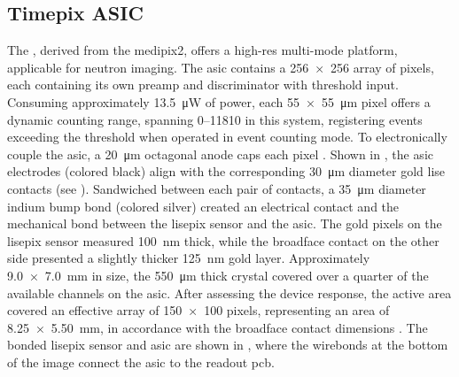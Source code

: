 \documentclass[../../../main.tex]{subfiles}
\begin{document}
%
    \subsection{Timepix ASIC}%
    \label{sec:chapter-3:advanced-imaging:timepix-asic}%
    The , derived from the \gls{medipix2}, offers a \gls{high-res} multi-mode platform, applicable for neutron imaging.
    The \gls{asic} contains a \num{256 x 256} array of pixels, each containing its own \gls{preamp} and discriminator with threshold input.
    Consuming approximately \SI{13.5}{\micro\watt} of power, each \SI{55 x 55}{\micro\meter} pixel offers a dynamic counting range, spanning \numrange{0}{11810} in this system, registering events exceeding the threshold when operated in event counting mode.
    To electronically couple the \gls{asic}, a \SI{20}{\micro\meter} octagonal anode caps each pixel \cite{Llopart_2007}.
    Shown in , the \gls{asic} electrodes (colored black) align with the corresponding \SI{30}{\micro\meter} diameter gold \gls{lise} contacts (see ).
    Sandwiched between each pair of contacts, a \SI{35}{\micro\meter} diameter indium bump bond (colored silver) created an electrical contact and the mechanical bond between the \gls{lisepix} sensor and the  \gls{asic}.
    The gold pixels on the \gls{lisepix} sensor measured \SI{100}{\nano\meter} thick, while the broadface contact on the other side presented a slightly thicker \SI{125}{\nano\meter} gold layer.    
    Approximately \SI{9.0 x 7.0}{\milli\meter} in size, the \SI{550}{\micro\meter} thick crystal covered over a quarter of the available channels on the \gls{asic}.
    After assessing the device response, the active area covered an effective array of \num{150 x 100} pixels, representing an area of \SI{8.25 x 5.50}{\milli\meter}, in accordance with the broadface contact dimensions \cite{Herrera_2018}.
    The bonded \gls{lisepix} sensor and \gls{asic} are shown in , where the wirebonds at the bottom of the image connect the \gls{asic} to the readout \gls{pcb}.
\end{document}
